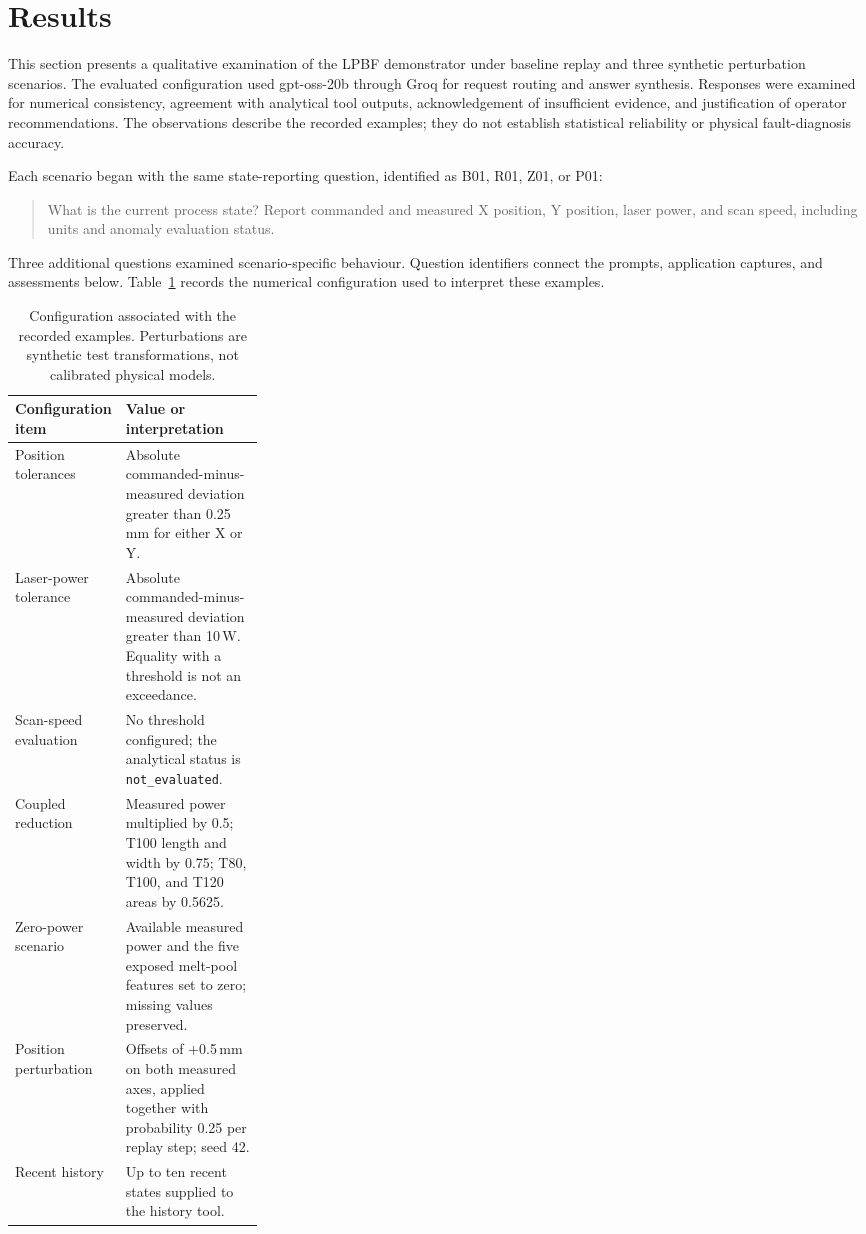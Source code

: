 \FloatBarrier
\section{Results}
\label{sec:results}

This section presents a qualitative examination of the LPBF demonstrator under baseline replay and three synthetic perturbation scenarios. The evaluated configuration used gpt-oss-20b through Groq for request routing and answer synthesis. Responses were examined for numerical consistency, agreement with analytical tool outputs, acknowledgement of insufficient evidence, and justification of operator recommendations. The observations describe the recorded examples; they do not establish statistical reliability or physical fault-diagnosis accuracy.

Each scenario began with the same state-reporting question, identified as B01, R01, Z01, or P01:
\begin{quote}
\small What is the current process state? Report commanded and measured X position, Y position, laser power, and scan speed, including units and anomaly evaluation status.
\end{quote}
Three additional questions examined scenario-specific behaviour. Question identifiers connect the prompts, application captures, and assessments below. Table~\ref{tab:results-configuration} records the numerical configuration used to interpret these examples.

\begin{table}[htbp]
\centering
\small
\renewcommand{\arraystretch}{1.16}
\begin{tabularx}{\linewidth}{@{}p{0.29\linewidth}X@{}}
\toprule
\textbf{Configuration item} & \textbf{Value or interpretation} \\
\midrule
Position tolerances & Absolute commanded-minus-measured deviation greater than 0.25\,mm for either X or Y. \\
Laser-power tolerance & Absolute commanded-minus-measured deviation greater than 10\,W. Equality with a threshold is not an exceedance. \\
Scan-speed evaluation & No threshold configured; the analytical status is \texttt{not\_evaluated}. \\
Coupled reduction & Measured power multiplied by 0.5; T100 length and width by 0.75; T80, T100, and T120 areas by 0.5625. \\
Zero-power scenario & Available measured power and the five exposed melt-pool features set to zero; missing values preserved. \\
Position perturbation & Offsets of +0.5\,mm on both measured axes, applied together with probability 0.25 per replay step; seed 42. \\
Recent history & Up to ten recent states supplied to the history tool. \\
\bottomrule
\end{tabularx}
\caption{Configuration associated with the recorded examples. Perturbations are synthetic test transformations, not calibrated physical models.}
\label{tab:results-configuration}
\end{table}

